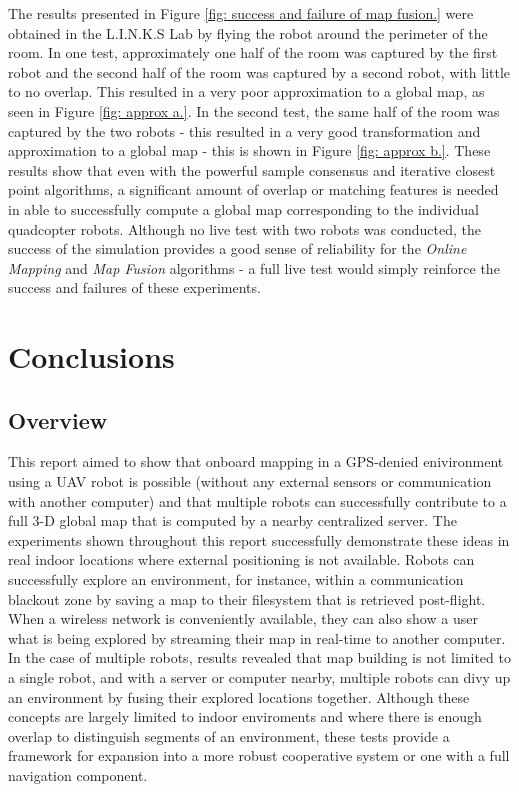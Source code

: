 \documentclass[letterpaper, oneside, 10pt]{report}
\begin{document}
\noindent The results presented in Figure \ref{fig: success and failure of map fusion.} were obtained in the L.I.N.K.S Lab by flying the robot around the perimeter of the room. In one test, approximately one half of the room was captured by the first robot and the second half of the room was captured by a second robot, with little to no overlap. This resulted in a very poor approximation to a global map, as seen in Figure \ref{fig: approx a.}. In the second test, the same half of the room was captured by the two robots - this resulted in a very good transformation and approximation to a global map - this is shown in Figure \ref{fig: approx b.}. These results show that even with the powerful sample consensus and iterative closest point algorithms, a significant amount of overlap or matching features is needed in able to successfully compute a global map corresponding to the individual quadcopter robots. Although no live test with two robots was conducted, the success of the simulation provides a good sense of reliability for the \textsl{Online Mapping} and \textsl{Map Fusion} algorithms - a full live test would simply reinforce the success and failures of these experiments.

\chapter{Conclusions}

\section{Overview}

This report aimed to show that onboard mapping in a GPS-denied enivironment using a UAV robot is possible (without any external sensors or communication with another computer) and that multiple robots can successfully contribute to a full 3-D global map that is computed by a nearby centralized server. The experiments shown throughout this report successfully demonstrate these ideas in real indoor locations where external positioning is not available. Robots can successfully explore an environment, for instance, within a communication blackout zone by saving a map to their filesystem that is retrieved post-flight. When a wireless network is conveniently available, they can also show a user what is being explored by streaming their map in real-time to another computer. In the case of multiple robots, results revealed that map building is not limited to a single robot, and with a server or computer nearby, multiple robots can divy up an environment by fusing their explored locations together. Although these concepts are largely limited to indoor enviroments and where there is enough overlap to distinguish segments of an environment, these tests provide a framework for expansion into a more robust cooperative system or one with a full navigation component.
\end{document}
